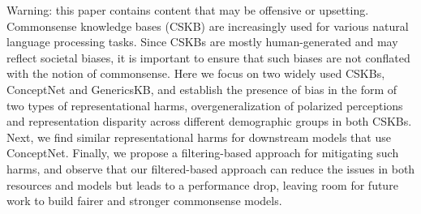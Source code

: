 Warning: this paper contains content that may be offensive or upsetting. Commonsense knowledge bases (CSKB) are increasingly used for various natural language processing tasks. Since CSKBs are mostly human-generated and may reflect societal biases, it is important to ensure that such biases are not conflated with the notion of commonsense. Here we focus on two widely used CSKBs, ConceptNet and GenericsKB, and establish the presence of bias in the form of two types of representational harms, overgeneralization of polarized perceptions and representation disparity across different demographic groups in both CSKBs. Next, we find similar representational harms for downstream models that use ConceptNet. Finally, we propose a filtering-based approach for mitigating such harms, and observe that our filtered-based approach can reduce the issues in both resources and models but leads to a performance drop, leaving room for future work to build fairer and stronger commonsense models.
